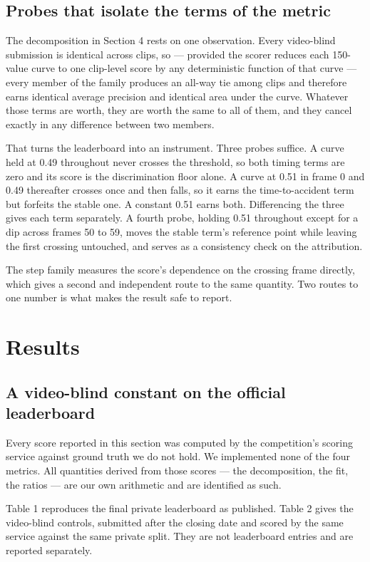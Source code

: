 \subsection{Probes that isolate the terms of the metric}

The decomposition in Section 4 rests on one observation. Every video-blind submission is identical across clips, so --- provided the scorer reduces each 150-value curve to one clip-level score by any deterministic function of that curve --- every member of the family produces an all-way tie among clips and therefore earns identical average precision and identical area under the curve. Whatever those terms are worth, they are worth the same to all of them, and they cancel exactly in any difference between two members.

That turns the leaderboard into an instrument. Three probes suffice. A curve held at 0.49 throughout never crosses the threshold, so both timing terms are zero and its score is the discrimination floor alone. A curve at 0.51 in frame 0 and 0.49 thereafter crosses once and then falls, so it earns the time-to-accident term but forfeits the stable one. A constant 0.51 earns both. Differencing the three gives each term separately. A fourth probe, holding 0.51 throughout except for a dip across frames 50 to 59, moves the stable term's reference point while leaving the first crossing untouched, and serves as a consistency check on the attribution.

The step family measures the score's dependence on the crossing frame directly, which gives a second and independent route to the same quantity. Two routes to one number is what makes the result safe to report.


\section{Results}


\subsection{A video-blind constant on the official leaderboard}
Every score reported in this section was computed by the competition's scoring service against ground truth we do not hold. We implemented none of the four metrics. All quantities derived from those scores --- the decomposition, the fit, the ratios --- are our own arithmetic and are identified as such.

Table 1 reproduces the final private leaderboard as published. Table 2 gives the video-blind controls, submitted after the closing date and scored by the same service against the same private split. They are not leaderboard entries and are reported separately.

